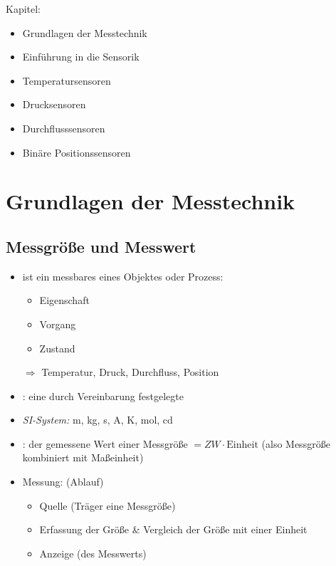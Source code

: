 Kapitel:
\begin{itemize}
\item Grundlagen der Messtechnik
\item Einführung in die Sensorik
\item Temperatursensoren
\item Drucksensoren
\item Durchflusssensoren
\item Binäre Positionssensoren
\end{itemize}

\chapter{Grundlagen der Messtechnik}

\section{Messgröße und Messwert}

\begin{itemize}
\item {} ist ein messbares  eines Objektes oder Prozess:
\begin{itemize}
\item Eigenschaft 
\item Vorgang
\item Zustand
\end{itemize}
$\Rightarrow$ Temperatur, Druck, Durchfluss, Position
\item {}: eine durch Vereinbarung festgelegte 
\item \emph{SI-System:} m, kg, s, A, K, mol, cd
\item {}: der gemessene Wert einer Messgröße $=ZW \cdot \mathrm{Einheit}$ (also Messgröße kombiniert mit Maßeinheit)
\item Messung: (Ablauf)
\begin{itemize}
\item Quelle (Träger eine Messgröße)
\item Erfassung der Größe \& Vergleich der Größe mit einer Einheit
\item Anzeige (des Messwerts)
\end{itemize}
\end{itemize}

